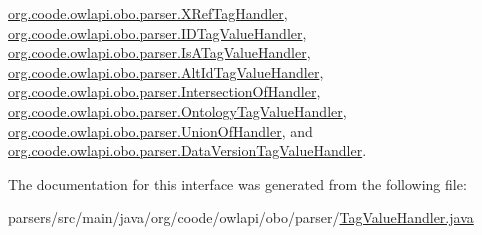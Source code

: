 \hyperlink{classorg_1_1coode_1_1owlapi_1_1obo_1_1parser_1_1_x_ref_tag_handler_a3c14e926789eb2b68371f0f01e082840}{org.\-coode.\-owlapi.\-obo.\-parser.\-X\-Ref\-Tag\-Handler}, \hyperlink{classorg_1_1coode_1_1owlapi_1_1obo_1_1parser_1_1_i_d_tag_value_handler_ae37f8af373b1ab11738e9858086868ca}{org.\-coode.\-owlapi.\-obo.\-parser.\-I\-D\-Tag\-Value\-Handler}, \hyperlink{classorg_1_1coode_1_1owlapi_1_1obo_1_1parser_1_1_is_a_tag_value_handler_a49b83e67e2ce13a4952af942a9227f10}{org.\-coode.\-owlapi.\-obo.\-parser.\-Is\-A\-Tag\-Value\-Handler}, \hyperlink{classorg_1_1coode_1_1owlapi_1_1obo_1_1parser_1_1_alt_id_tag_value_handler_a7dcfae6b5a38e4b47dbdfecb536bb99f}{org.\-coode.\-owlapi.\-obo.\-parser.\-Alt\-Id\-Tag\-Value\-Handler}, \hyperlink{classorg_1_1coode_1_1owlapi_1_1obo_1_1parser_1_1_intersection_of_handler_a06a45f946c737e3483deb830721e4644}{org.\-coode.\-owlapi.\-obo.\-parser.\-Intersection\-Of\-Handler}, \hyperlink{classorg_1_1coode_1_1owlapi_1_1obo_1_1parser_1_1_ontology_tag_value_handler_a9e3180ae94d3d4e4cac47596ece91e0c}{org.\-coode.\-owlapi.\-obo.\-parser.\-Ontology\-Tag\-Value\-Handler}, \hyperlink{classorg_1_1coode_1_1owlapi_1_1obo_1_1parser_1_1_union_of_handler_a7bc4c35d4059d86abaed2adee06fe5d1}{org.\-coode.\-owlapi.\-obo.\-parser.\-Union\-Of\-Handler}, and \hyperlink{classorg_1_1coode_1_1owlapi_1_1obo_1_1parser_1_1_data_version_tag_value_handler_a055fd84037ae2b82afca6397c0fd719a}{org.\-coode.\-owlapi.\-obo.\-parser.\-Data\-Version\-Tag\-Value\-Handler}.



The documentation for this interface was generated from the following file\-:\begin{DoxyCompactItemize}
\item 
parsers/src/main/java/org/coode/owlapi/obo/parser/\hyperlink{_tag_value_handler_8java}{Tag\-Value\-Handler.\-java}\end{DoxyCompactItemize}
